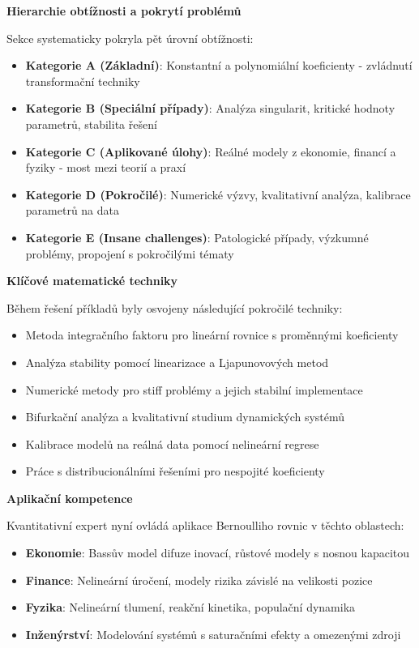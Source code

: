 \vspace{1\baselineskip}

\noindent\textbf{Hierarchie obtížnosti a pokrytí problémů}

Sekce systematicky pokryla pět úrovní obtížnosti:

\begin{itemize}
\item \textbf{Kategorie A (Základní)}: Konstantní a polynomiální koeficienty - zvládnutí transformační techniky
\item \textbf{Kategorie B (Speciální případy)}: Analýza singularit, kritické hodnoty parametrů, stabilita řešení
\item \textbf{Kategorie C (Aplikované úlohy)}: Reálné modely z ekonomie, financí a fyziky - most mezi teorií a praxí
\item \textbf{Kategorie D (Pokročilé)}: Numerické výzvy, kvalitativní analýza, kalibrace parametrů na data
\item \textbf{Kategorie E (Insane challenges)}: Patologické případy, výzkumné problémy, propojení s pokročilými tématy
\end{itemize}

\vspace{1\baselineskip}

\noindent\textbf{Klíčové matematické techniky}

Během řešení příkladů byly osvojeny následující pokročilé techniky:
\begin{itemize}
\item Metoda integračního faktoru pro lineární rovnice s proměnnými koeficienty
\item Analýza stability pomocí linearizace a Ljapunovových metod
\item Numerické metody pro stiff problémy a jejich stabilní implementace
\item Bifurkační analýza a kvalitativní studium dynamických systémů
\item Kalibrace modelů na reálná data pomocí nelineární regrese
\item Práce s distribucionálními řešeními pro nespojité koeficienty
\end{itemize}

\vspace{1\baselineskip}

\noindent\textbf{Aplikační kompetence}

Kvantitativní expert nyní ovládá aplikace Bernoulliho rovnic v těchto oblastech:
\begin{itemize}
\item \textbf{Ekonomie}: Bassův model difuze inovací, růstové modely s nosnou kapacitou
\item \textbf{Finance}: Nelineární úročení, modely rizika závislé na velikosti pozice
\item \textbf{Fyzika}: Nelineární tlumení, reakční kinetika, populační dynamika
\item \textbf{Inženýrství}: Modelování systémů s saturačními efekty a omezenými zdroji
\end{itemize}

